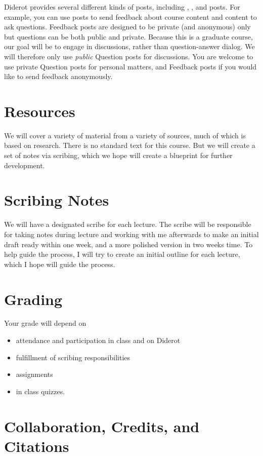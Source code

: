 Diderot provides several different kinds of posts, including , , and  posts.
%
For example, you can use  posts to send feedback about course content and  content to ask questions.
%
Feedback posts are designed to be private (and anonymous) only but questions can be both public and private.
%
Because this is a graduate course, our goal will be to engage in discussions, rather than question-answer dialog.
%
We will therefore only use \emph{public} Question posts for discussions.
%
You are welcome to use private Question posts for personal matters, and Feedback posts if you would like to send feedback anonymously. 


\section{Resources}

We will cover a variety of material from a variety of sources, much of which is based on research.
%
There is no standard text for this course.
%
But we will create a set of notes via scribing, which we hope will create a blueprint for further development.


\section{Scribing Notes}

We will have a  designated scribe for each lecture.
%
The scribe will be responsible for taking notes during lecture and working with me afterwards to make an initial draft ready within one week, and a more polished version in two weeks time.
%
To help guide the process, I will try to create an initial outline for each lecture, which I hope will guide the process.

\section{Grading}
Your grade will depend on 
\begin{itemize}
\item attendance and participation in class and on Diderot
\item fulfillment of scribing responsibilities
\item assignments 
\item in class quizzes.
\end{itemize}

\section{Collaboration, Credits, and Citations}


